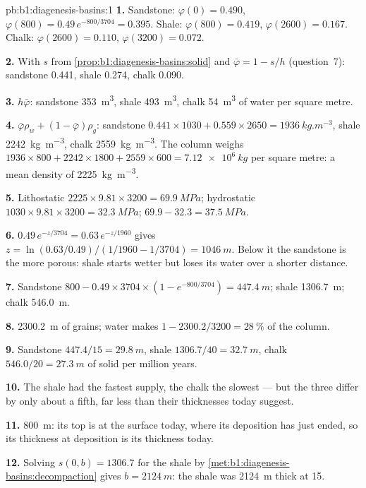 \begin{solution}{pb:b1:diagenesis-basins:1}
\textbf{1.} Sandstone: $\varphi(0) = \num{0.490}$, $\varphi(800) =
0.49\,e^{-800/3704} = \num{0.395}$. Shale: $\varphi(800) = \num{0.419}$,
$\varphi(2600) = \num{0.167}$. Chalk: $\varphi(2600) = \num{0.110}$,
$\varphi(3200) = \num{0.072}$.

\textbf{2.} With $s$ from \cref{prop:b1:diagenesis-basins:solid} and $\bar\varphi
= 1 - s/h$ (question~7): sandstone \num{0.441}, shale \num{0.274}, chalk
\num{0.090}.

\textbf{3.} $h\bar\varphi$: sandstone \qty{353}{m^3}, shale \qty{493}{m^3}, chalk
\qty{54}{m^3} of water per square metre.

\textbf{4.} $\bar\varphi\rho_w + (1 - \bar\varphi)\rho_g$: sandstone
$0.441\times1030 + 0.559\times2650 = \qty{1936}{kg.m^{-3}}$, shale
\qty{2242}{kg.m^{-3}}, chalk \qty{2559}{kg.m^{-3}}. The column weighs
$1936\times800 + 2242\times1800 + 2559\times600 = \qty{7.12e6}{kg}$ per square
metre: a mean density of \qty{2225}{kg.m^{-3}}.

\textbf{5.} Lithostatic $2225\times9.81\times3200 = \qty{69.9}{MPa}$; hydrostatic
$1030\times9.81\times3200 = \qty{32.3}{MPa}$; 
$69.9 - 32.3 = \qty{37.5}{MPa}$.

\textbf{6.} $0.49\,e^{-z/3704} = 0.63\,e^{-z/1960}$ gives $z = \ln(0.63/0.49)
/(1/1960 - 1/3704) = \qty{1046}{m}$. Below it the sandstone is the more porous:
shale starts wetter but loses its water over a shorter distance.

\textbf{7.} Sandstone $800 - 0.49\times3704\times(1 - e^{-800/3704}) =
\qty{447.4}{m}$; shale \qty{1306.7}{m}; chalk \qty{546.0}{m}.

\textbf{8.} \qty{2300.2}{m} of grains; water makes $1 - 2300.2/3200 =
\qty{28}{\%}$ of the column.

\textbf{9.} Sandstone $447.4/15 = \qty{29.8}{m}$, shale $1306.7/40 =
\qty{32.7}{m}$, chalk $546.0/20 = \qty{27.3}{m}$ of solid per million years.

\textbf{10.} The shale had the fastest supply, the chalk the slowest --- but the
three differ by only about a fifth, far less than their thicknesses today
suggest.

\textbf{11.} \qty{800}{m}: its top is at the surface today, where its deposition
has just ended, so its thickness at deposition is its thickness today.

\textbf{12.} Solving $s(0, b) = 1306.7$ for the shale by
\cref{met:b1:diagenesis-basins:decompaction} gives $b = \qty{2124}{m}$: the shale
was \qty{2124}{m} thick at \qty{15}{\Ma}.


\end{solution}
